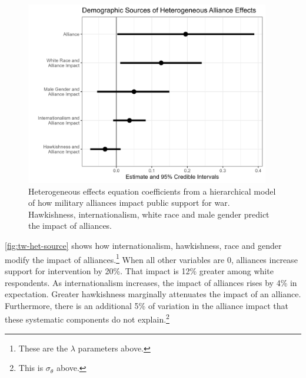 \documentclass[12pt]{article}
\begin{document}
\begin{figure}[htpb]
	\centering
		\includegraphics[width=0.95\textwidth]{../figures/tw-het-source.png}
	\caption{Heterogeneous effects equation coefficients from a hierarchical model of how military alliances impact public support for war. Hawkishness, internationalism, white race and male gender predict the impact of alliances.}
	\label{fig:tw-het-source}
\end{figure}


\autoref{fig:tw-het-source} shows how internationalism, hawkishness, race and gender modify the impact of alliances.\footnote{These are the $\lambda$ parameters above.}
When all other variables are 0, alliances increase support for intervention by 20\%. 
That impact is 12\% greater among white respondents. 
As internationalism increases, the impact of alliances rises by 4\% in expectation.
Greater hawkishness marginally attenuates the impact of an alliance. 
Furthermore, there is an additional 5\% of variation in the alliance impact that these systematic components do not explain.\footnote{This is $\sigma_\theta$ above.}
\end{document}
